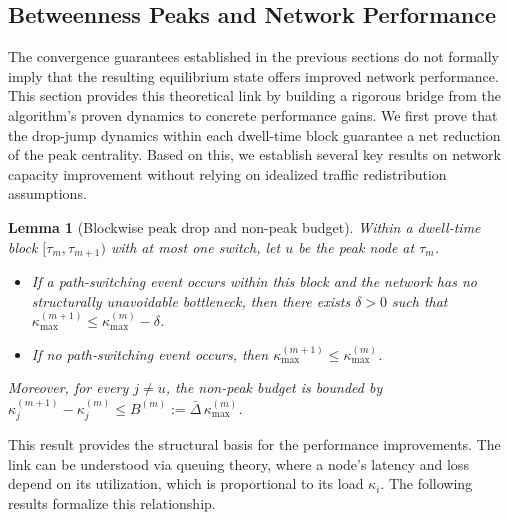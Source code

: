 \documentclass[journal]{IEEEtran}
\newtheorem{lemma}{Lemma}
\begin{document}
\subsection{Betweenness Peaks and Network Performance}
\label{subsec:theory_bridge}


The convergence guarantees established in the previous sections do not formally imply that the resulting equilibrium state offers improved network performance. This section provides this theoretical link by building a rigorous bridge from the algorithm's proven dynamics to concrete performance gains. We first prove that the drop-jump dynamics within each dwell-time block guarantee a net reduction of the peak centrality. Based on this, we establish several key results on network capacity improvement without relying on idealized traffic redistribution assumptions.

\begin{lemma}[Blockwise peak drop and non-peak budget]
\label{lem:block-budget}
Within a dwell-time block $[\tau_m,\tau_{m+1})$ with at most one switch, let $u$ be the peak node at $\tau_m$.
\begin{itemize}
    \item If a path-switching event occurs within this block and the network has no structurally unavoidable bottleneck, then there exists $\delta>0$ such that $\kappa^{(m+1)}_{\max}\le \kappa^{(m)}_{\max}-\delta$.
    \item If no path-switching event occurs, then $\kappa^{(m+1)}_{\max}\le \kappa^{(m)}_{\max}$.
\end{itemize}
Moreover, for every $j\neq u$, the non-peak budget is bounded by $\kappa^{(m+1)}_j-\kappa^{(m)}_j \le B^{(m)}:=\bar\Delta\,\kappa^{(m)}_{\max}$.
\end{lemma}

This result provides the structural basis for the performance improvements. The link can be understood via queuing theory, where a node's latency and loss depend on its utilization, which is proportional to its load $\kappa_i$. The following results formalize this relationship.
\end{document}
